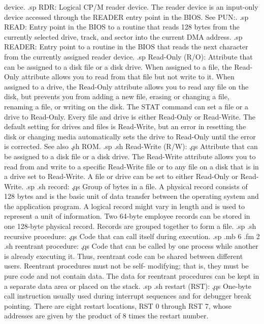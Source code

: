device.
.sp
RDR:
Logical CP/M reader device.  The reader device is an input-only 
device accessed through the READER entry point in the BIOS.
See
PUN:.
.sp
READ:
Entry point in the BIOS to a routine that reads 128 bytes from 
the currently selected drive, track, and sector into the current 
DMA address.
.sp
READER:
Entry point to a routine in the BIOS that reads the next 
character from the currently assigned reader device.
.sp
Read-Only (R/O):
Attribute that can be assigned to a disk file or a disk drive.  
When assigned to a file, the Read-Only attribute allows you to 
read from that file but not write to it.  When assigned to a 
drive, the Read-Only attribute allows you to read any file on the 
disk, but prevents you from adding a new file, erasing or changing 
a file, renaming a file, or writing on the disk.  The STAT 
command can set a file or a drive to Read-Only.  Every file and 
drive is either Read-Only or Read-Write.  The default setting for 
drives and files is Read-Write, but an error in resetting the 
disk or changing media automatically sets the drive to Read-Only 
until the error is corrected.  See also \c
.sh
ROM.
.sp
.sh
Read-Write (R/W):  \c
.qs
Attribute that can be assigned to a disk file or a disk drive.  
The Read-Write attribute allows you to read from and write to a 
specific Read-Write file or to any file on a disk that is in a 
drive set to Read-Write.  A file or drive can be set to either 
Read-Only or Read-Write.
.sp
.sh
record:  \c
.qs
Group of bytes in a file.  A physical record consists of 128 
bytes and is the basic unit of data transfer between the 
operating system and the application program.  A logical record 
might vary in length and is used to represent a unit of 
information.  Two 64-byte employee records can be stored in one 
128-byte physical record.  Records are grouped together to form a 
file.
.sp
.sh
recursive procedure:  \c
.qs
Code that can call itself during execution.
.sp
.mb 6
.fm 2
.sh
reentrant procedure:  \c
.qs
Code that can be called by one process while another is already 
executing it.  Thus, reentrant code can be shared between 
different users.  Reentrant procedures must not be self-
modifying; that is, they must be pure code and not contain data.  
The data for reentrant procedures can be kept in a separate data 
area or placed on the stack.
.sp
.sh
restart (RST):  \c
.qs
One-byte call instruction usually used during interrupt sequences 
and for debugger break pointing.  There are eight restart 
locations, RST 0 through RST 7, whose addresses are given by the 
product of 8 times the restart number.
